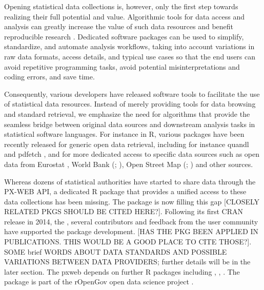 Opening statistical data collections is, however, only the first step towards realizing their full potential and value. Algorithmic tools for data access and analysis can greatly increase the value of such data resources and benefit reproducible research \citep{Gandrud13, Boettiger2015}. Dedicated software packages can be used to simplify, standardize, and automate analysis workflows, taking into account variations in raw data formats, access details, and typical use cases so that the end users can avoid  repetitive programming tasks, avoid potential misinterpretations and coding errors, and save time. 

Consequently, various developers have released software tools to facilitate the use of statistical data resources. Instead of merely providing tools for data browsing and standard retrieval, we emphasize the need for algorithms that provide the seamless bridge between original data sources and downstream analysis tasks in statistical software languages. For instance in R, various packages have been recently released for generic open data retrieval, including for instance quandl \cite{quandl} and pdfetch \cite{pdfetch}, and for more dedicated access to specific data sources such as open data from Eurostat \cite{Lahti17eurostat}, World Bank (; \citealt{WDI}), Open Street Map (; \citealt{osmar}) and other sources.

Whereas dozens of statistical authorities have started to share data through the PX-WEB API, 
a dedicated R package that provides a unified access to these data collections has been missing. The  package is now filling this gap [CLOSELY RELATED PKGS SHOULD BE CITED HERE?]. Following its first CRAN release in 2014, the , several contributors and feedback from the user community have supported the package development. 
[HAS THE PKG BEEN APPLIED IN PUBLICATIONS. THIS WOULD BE A GOOD PLACE TO CITE THOSE?].  SOME brief WORDS ABOUT DATA STANDARDS AND POSSIBLE VARIATIONS BETWEEN DATA PROVIDERS; further details will be in the later section. The pxweb depends on further R packages including  \citep{checkmate},  \citep{httr},  \citep{jsonlite}. The  package is part of the rOpenGov open data science project \citep{Lahti13icml}. 

